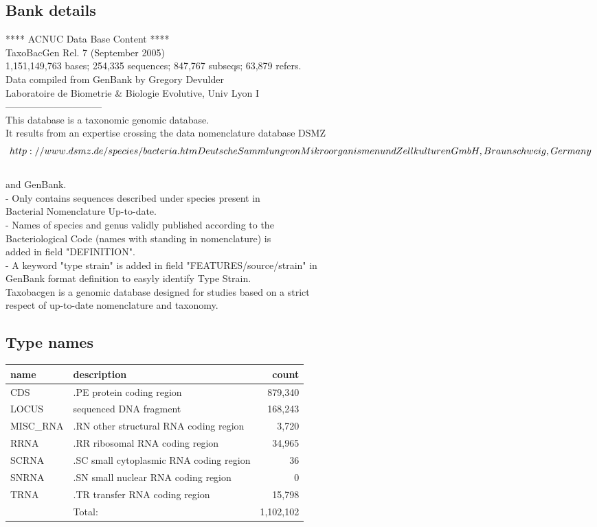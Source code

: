 \documentclass{article}
\begin{document}
\begin{Schunk}
\subsection{Bank details}
               ****     ACNUC Data Base Content      ****\\
                 TaxoBacGen Rel. 7 (September 2005)\\
1,151,149,763 bases; 254,335 sequences; 847,767 subseqs; 63,879 refers.\\
	Data compiled from GenBank by Gregory Devulder \\
        Laboratoire de Biometrie \& Biologie Evolutive, Univ Lyon I\\
------------------------------\\
This database is a taxonomic genomic database. \\
It results from an expertise crossing the data nomenclature database DSMZ\\
\[http://www.dsmz.de/species/bacteria.htm Deutsche Sammlung von\\
Mikroorganismen und Zellkulturen GmbH, Braunschweig, Germany\]\\
and GenBank. \\
- Only contains sequences described under species present in \\
Bacterial Nomenclature Up-to-date.\\
- Names of species and genus validly published according to the\\
Bacteriological Code (names with standing in nomenclature) is \\
added in field "DEFINITION".\\
- A keyword "type strain" is added in field "FEATURES/source/strain" in\\
GenBank format definition to easyly identify Type Strain.\\
Taxobacgen is a genomic database designed for studies based on a strict\\
respect of up-to-date nomenclature and taxonomy.

\subsection{Type names}
\noindent\begin{tabular}{llr}
\hline \hline
name & description & count \\
\hline
CDS  &  .PE protein coding region  &  879,340 \\
LOCUS  &  sequenced DNA fragment  &  168,243 \\
MISC\_RNA  &  .RN other structural RNA coding region  &  3,720 \\
RRNA  &  .RR ribosomal RNA coding region  &  34,965 \\
SCRNA  &  .SC small cytoplasmic RNA coding region  &  36 \\
SNRNA  &  .SN small nuclear RNA coding region  &  0 \\
TRNA  &  .TR transfer RNA coding region  &  15,798 \\
\hline
 & Total: & 1,102,102 \\
\hline \hline
\end{tabular}


\end{Schunk}
\end{document}
